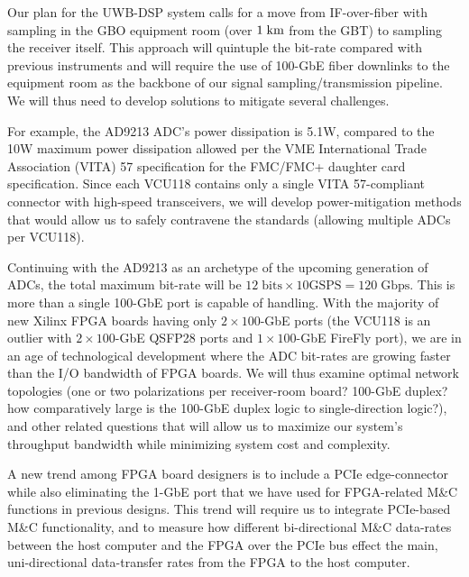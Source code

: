 \documentclass[10pt]{myNSF}
\begin{document}
Our plan for the UWB-DSP system calls for a move from IF-over-fiber
with sampling in the GBO equipment room (over $1\; \textrm{km}$ from the GBT)
to sampling the receiver itself.  This approach will quintuple the
bit-rate compared with previous instruments and will require the use
of 100-GbE fiber downlinks to the equipment room as the backbone of
our signal sampling/transmission pipeline.  We will thus need to
develop solutions to mitigate several challenges.

For example, the AD9213 ADC's power dissipation is 5.1W, compared to
the 10W maximum power dissipation allowed per the VME International
Trade Association (VITA) 57 specification for the FMC/FMC+ daughter
card specification. Since each VCU118 contains only a single VITA
57-compliant connector with high-speed transceivers, we will develop
power-mitigation methods that would allow us to safely contravene the
standards (allowing multiple ADCs per VCU118).

Continuing with the AD9213 as an archetype of the upcoming generation
of ADCs, the total maximum bit-rate will be $12\; \mathrm{bits} \times
10 \mathrm{GSPS} = 120\; \mathrm{Gbps}$.  This is more than a single
100-GbE port is capable of handling.  With the majority of new Xilinx
FPGA boards having only $2 \times 100$-GbE ports (the VCU118 is an
outlier with $2 \times100$-GbE QSFP28 ports and $1 \times 100$-GbE
FireFly port), we are in an age of technological development where the
ADC bit-rates are growing faster than the I/O bandwidth of FPGA
boards. We will thus examine optimal network topologies (one or two
polarizations per receiver-room board? 100-GbE duplex? how
comparatively large is the 100-GbE duplex logic to single-direction
logic?), and other related questions that will allow us to maximize
our system's throughput bandwidth while minimizing system cost and
complexity.

A new trend among FPGA board designers is to include a PCIe
edge-connector while also eliminating the 1-GbE port that we have used
for FPGA-related M\&C functions in previous designs. This trend will
require us to integrate PCIe-based M\&C functionality, and to measure
how different bi-directional M\&C data-rates between the host computer
and the FPGA over the PCIe bus effect the main, uni-directional
data-transfer rates from the FPGA to the host computer.


\label{sec:rfi_excision}

\end{document}
